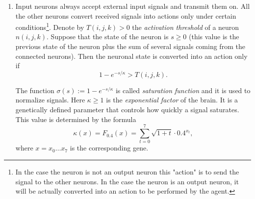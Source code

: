 \documentclass[12pt,a4paper]{article}
\begin{document}
\begin{enumerate}
	For a connection created by \emph{developmental rescue}, the corresponding initial weight is instead
	\begin{equation}
		w_{i,j,k}^{u,v,w}=\max\!\left\{\left(1-A_{i,j,k}(x)^2\right)H_{i,j,k}(u,v,w,x)^2,\,0.1\right\}.
		\label{rescue_synaptic_weight}
	\end{equation}

	The source-dependent attenuation factor $1-A_{i,j,k}(x)^2$ is the same in both expressions. During ordinary construction, positive values of $H$ determine eligibility and ranking, during rescue, neighboring candidates are ranked by $H^2>0$, regardless of the sign of $H$. The attenuation and the minimum initial weight of $0.1$ are applied only after selecting the connection, so neither affects candidate ranking or eligibility. Thus, every connection created during initial development has weight in $[0.1,1]$, including cases where finite-precision evaluation of $A$ yields $|A|=1$ and the attenuation vanishes. This floor concerns the initial weight only, subsequent synaptic dynamics may weaken or remove connections. For connections originating from input neurons, the input-specific minimum weight defined below is also enforced using the \emph{input influence gene}, so their final initial weight is the maximum of the value in Equation~\ref{initial_synaptic_weight} or~\ref{rescue_synaptic_weight} (as appropriate) and $1/(1+\psi(x))$.

	\item Input neurons always accept external input signals and transmit them on. All the other neurons convert received signals into actions only under certain conditions\footnote{In the case the neuron is not an output neuron this "action" is to send the signal to the other neurons. In the case the neuron is an output neuron, it will be actually converted into an action to be performed by the agent.}. Denote by $T(i, j, k) > 0$ the \emph{activation threshold} of a neuron $n(i, j, k)$. Suppose that the state of the neuron is $s \geq 0$ (this value is the previous state of the neuron plus the sum of several signals coming from the connected neurons). Then the neuronal state is converted into an action only if
	$$1 - e^{-s/\kappa} > T(i, j, k).$$
	
	The function $\sigma(s) := 1 - e^{-s/\kappa}$ is called \emph{saturation function} and it is used to normalize signals. Here $\kappa \geq 1$ is the \emph{exponential factor} of the brain. It is a genetically defined parameter that controls how quickly a signal saturates. This value is determined by the formula
	$$\kappa(x) = F_{0.4}(x) = \sum_{t=0}^7 \sqrt{1 + t} \cdot 0.4^{x_t},$$
where  $x = x_0 \ldots x_7$ is the corresponding gene.


\end{enumerate}
\end{document}
